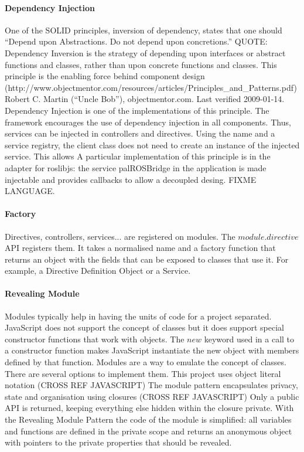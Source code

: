 \paragraph{Dependency Injection} One of the \ac{SOLID} principles, inversion of dependency, states that one should “Depend upon Abstractions. Do not depend upon concretions.”
QUOTE: Dependency Inversion is the strategy of depending upon interfaces or abstract functions and classes, rather than upon concrete functions and classes. This principle is the enabling force behind component design (http://www.objectmentor.com/resources/articles/Principles_and_Patterns.pdf) Robert C. Martin (“Uncle Bob”), objectmentor.com. Last verified 2009-01-14.
Dependency Injection is one of the implementations of this principle.
The framework encourages the use of dependency injection in all components. 
Thus, services can be injected in controllers and directives.
Using the name and a service registry, the client class does not need to create an instance of the injected service. This allows
A particular implementation of this principle is in the adapter for roslibjs: the service palROSBridge in the application is made injectable and provides callbacks to allow a decoupled desing. FIXME LANGUAGE.

\paragraph{Factory} Directives, controllers, services... are registered on modules. 
The $module.directive$ \ac{API} registers them. 
It takes a normalised name and a factory function that returns an object with the fields that can be exposed to classes that use it.
For example, a Directive Definition Object or a Service.

\paragraph{Revealing Module} \cite{Osmani:2012} Modules typically help in having the units of code for a project separated.
JavaScript does not support the concept of classes but it does support special constructor functions that work with objects. 
The $new$ keyword used in a call to a constructor function makes JavaScript instantiate the new object with members defined by that function.
Modules are a way to emulate the concept of classes.
There are several options to implement them. 
This project uses object literal notation (CROSS REF JAVASCRIPT)
The module pattern encapsulates privacy, state and organisation using closures (CROSS REF JAVASCRIPT)
Only a public \ac{API} is returned, keeping everything else hidden within the closure private.
With the Revealing Module Pattern the code of the module is simplified: all variables and functions are defined in the private scope and returns an anonymous object with pointers to the private properties that should be revealed.

